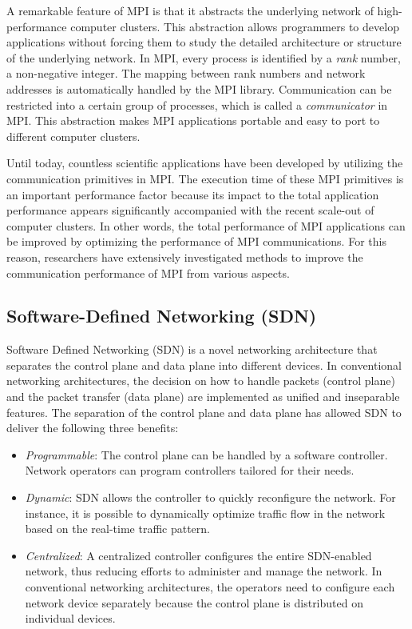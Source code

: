 A remarkable feature of MPI is that it abstracts the underlying network
of high-performance computer clusters. This abstraction allows
programmers to develop applications without forcing them to study the
detailed architecture or structure of the underlying network. In MPI,
every process is identified by a \emph{rank} number, a non-negative
integer. The mapping between rank numbers and network addresses is
automatically handled by the MPI library. Communication can be
restricted into a certain group of processes, which is called a
\emph{communicator} in MPI\@. This abstraction makes MPI applications
portable and easy to port to different computer clusters.

Until today, countless scientific applications have been developed by
utilizing the communication primitives in MPI\@. The execution time of
these MPI primitives is an important performance factor because its
impact to the total application performance appears significantly
accompanied with the recent scale-out of computer clusters. In other
words, the total performance of MPI applications can be improved by
optimizing the performance of MPI communications. For this reason,
researchers have extensively investigated methods to improve the
communication performance of MPI from various aspects.

\subsection{Software-Defined Networking (SDN)}

Software Defined Networking (SDN) is a novel networking architecture
that separates the control plane and data plane into different devices.
In conventional networking architectures, the decision on how to handle
packets (control plane) and the packet transfer (data plane) are
implemented as unified and inseparable features. The separation of the
control plane and data plane has allowed SDN to deliver the following
three benefits:

\begin{itemize}
\item
  \emph{Programmable}: The control plane can be handled by a software
  controller. Network operators can program controllers tailored for
  their needs.
\item
  \emph{Dynamic}: SDN allows the controller to quickly reconfigure the
  network. For instance, it is possible to dynamically optimize traffic
  flow in the network based on the real-time traffic pattern.
\item
  \emph{Centralized}: A centralized controller configures the entire
  SDN-enabled network, thus reducing efforts to administer and manage
  the network. In conventional networking architectures, the operators
  need to configure each network device separately because the control
  plane is distributed on individual devices.
\end{itemize}

